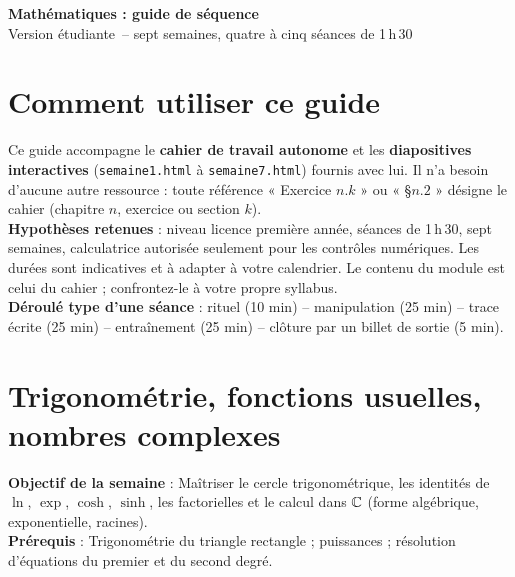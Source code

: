 \documentclass[10.5pt,a4paper]{article}
\newcommand{\titrecourant}{Guide de séquence}
\begin{document}
\begin{center}{\LARGE\bfseries\textcolor{marine}{Mathématiques : guide de séquence}}\\[3pt]
{\large\textcolor{ardoise}{Version étudiante\ -- sept semaines, quatre à cinq séances de 1\,h\,30}}\end{center}
\section*{Comment utiliser ce guide}
\begin{objectif}
Ce guide accompagne le \textbf{cahier de travail autonome} et les \textbf{diapositives interactives} (\texttt{semaine1.html} à \texttt{semaine7.html}) fournis avec lui. Il n'a besoin d'aucune autre ressource : toute référence « Exercice $n.k$ » ou « \S$n.2$ » désigne le cahier (chapitre $n$, exercice ou section $k$).\\
\textbf{Hypothèses retenues} : niveau licence première année, séances de 1\,h\,30, sept semaines, calculatrice autorisée seulement pour les contrôles numériques. Les durées sont indicatives et à adapter à votre calendrier. Le contenu du module est celui du cahier ; confrontez-le à votre propre syllabus.\\
\textbf{Déroulé type d'une séance} : rituel (10 min) -- manipulation (25 min) -- trace écrite (25 min) -- entraînement (25 min) -- clôture par un billet de sortie (5 min).
\end{objectif}
\clearpage
\section{Trigonométrie, fonctions usuelles, nombres complexes}
\renewcommand{\titrecourant}{Semaine 1}
\begin{objectif}\textbf{Objectif de la semaine} : Maîtriser le cercle trigonométrique, les identités de $\ln$, $\exp$, $\cosh$, $\sinh$, les factorielles et le calcul dans $\mathbb{C}$ (forme algébrique, exponentielle, racines).\\\textbf{Prérequis} : Trigonométrie du triangle rectangle ; puissances ; résolution d'équations du premier et du second degré.\end{objectif}
\end{document}
